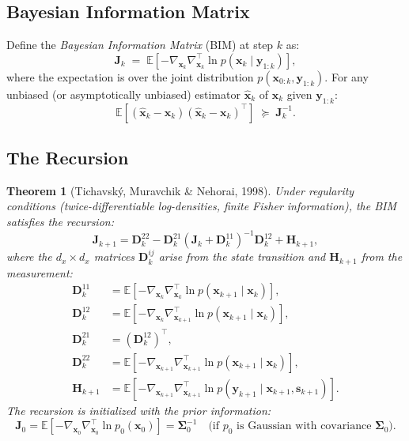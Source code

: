 \documentclass[11pt,a4paper]{article}
\newcommand{\E}{\mathbb{E}}
\newtheorem{theorem}{Theorem}
\begin{document}
\subsection{Bayesian Information Matrix}

Define the \emph{Bayesian Information Matrix} (BIM) at step $k$ as:
\begin{equation}
  \bm{J}_k \;=\; \E\!\left[-\nabla_{\bm{x}_k} \nabla_{\bm{x}_k}^\top \ln p(\bm{x}_k \mid \bm{y}_{1:k})\right],
  \label{eq:bim}
\end{equation}
where the expectation is over the joint distribution $p(\bm{x}_{0:k}, \bm{y}_{1:k})$.  For any unbiased (or asymptotically unbiased) estimator $\hat{\bm{x}}_k$ of $\bm{x}_k$ given $\bm{y}_{1:k}$:
\begin{equation}
  \E\!\left[(\hat{\bm{x}}_k - \bm{x}_k)(\hat{\bm{x}}_k - \bm{x}_k)^\top\right] \;\succeq\; \bm{J}_k^{-1}.
  \label{eq:pcrb}
\end{equation}

\subsection{The Recursion}

\begin{theorem}[Tichavsk\'y, Muravchik \& Nehorai, 1998]
\label{thm:pcrb}
Under regularity conditions (twice-differentiable log-densities, finite Fisher information), the BIM satisfies the recursion:
\begin{equation}
  \bm{J}_{k+1} = \bm{D}_k^{22} - \bm{D}_k^{21}\left(\bm{J}_k + \bm{D}_k^{11}\right)^{-1}\bm{D}_k^{12} + \bm{H}_{k+1},
  \label{eq:recursion}
\end{equation}
where the $d_x \times d_x$ matrices $\bm{D}_k^{ij}$ arise from the state transition and $\bm{H}_{k+1}$ from the measurement:
\begin{align}
  \bm{D}_k^{11} &= \E\!\left[-\nabla_{\bm{x}_k} \nabla_{\bm{x}_k}^\top \ln p(\bm{x}_{k+1} \mid \bm{x}_k)\right], \label{eq:D11} \\
  \bm{D}_k^{12} &= \E\!\left[-\nabla_{\bm{x}_k} \nabla_{\bm{x}_{k+1}}^\top \ln p(\bm{x}_{k+1} \mid \bm{x}_k)\right], \label{eq:D12} \\
  \bm{D}_k^{21} &= \left(\bm{D}_k^{12}\right)^\top, \label{eq:D21} \\
  \bm{D}_k^{22} &= \E\!\left[-\nabla_{\bm{x}_{k+1}} \nabla_{\bm{x}_{k+1}}^\top \ln p(\bm{x}_{k+1} \mid \bm{x}_k)\right], \label{eq:D22} \\
  \bm{H}_{k+1} &= \E\!\left[-\nabla_{\bm{x}_{k+1}} \nabla_{\bm{x}_{k+1}}^\top \ln p(\bm{y}_{k+1} \mid \bm{x}_{k+1}, \bm{s}_{k+1})\right]. \label{eq:H}
\end{align}
The recursion is initialized with the prior information:
\begin{equation}
  \bm{J}_0 = \E\!\left[-\nabla_{\bm{x}_0} \nabla_{\bm{x}_0}^\top \ln p_0(\bm{x}_0)\right] = \bm{\Sigma}_0^{-1} \quad \text{(if $p_0$ is Gaussian with covariance $\bm{\Sigma}_0$)}.
  \label{eq:J0}
\end{equation}
\end{theorem}
\end{document}
